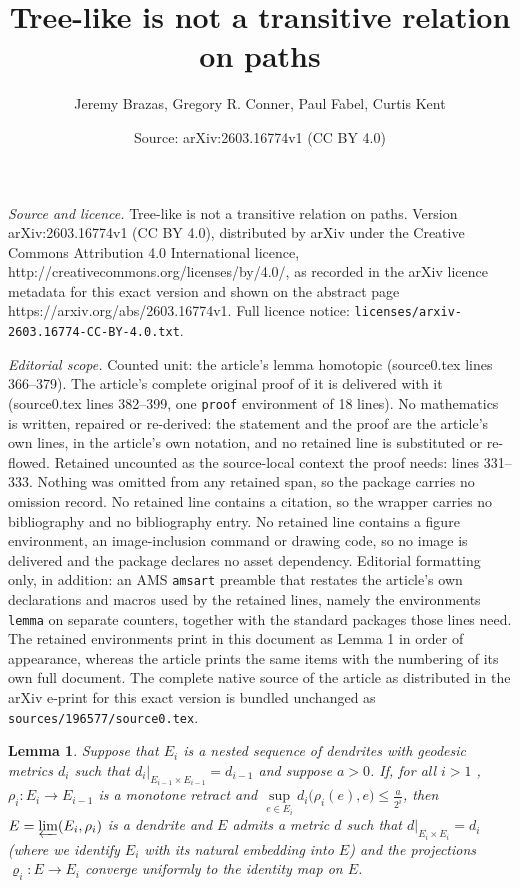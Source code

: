 \documentclass[10pt,a4paper]{amsart}
\title{Tree-like is not a transitive relation on paths}
\author{Jeremy Brazas, Gregory R. Conner, Paul Fabel, Curtis Kent}
\date{Source: arXiv:2603.16774v1 (CC BY 4.0)}
\newtheorem{lemma}{Lemma}
\begin{document}
\maketitle

\noindent\emph{Source and licence.} Tree-like is not a transitive relation on paths. Version arXiv:2603.16774v1 (CC BY 4.0), distributed by arXiv under the Creative Commons Attribution 4.0 International licence, http://creativecommons.org/licenses/by/4.0/, as recorded in the arXiv licence metadata for this exact version and shown on the abstract page https://arxiv.org/abs/2603.16774v1. Full licence notice: \texttt{licenses/arxiv-2603.16774-CC-BY-4.0.txt}.\par\smallskip

\noindent\textit{Editorial scope.} Counted unit: the article's lemma homotopic (source0.tex lines 366--379). The article's complete original proof of it is delivered with it (source0.tex lines 382--399, one \texttt{proof} environment of 18 lines). No mathematics is written, repaired or re-derived: the statement and the proof are the article's own lines, in the article's own notation, and no retained line is substituted or re-flowed.  Retained uncounted as the source-local context the proof needs: lines 331--333.  Nothing was omitted from any retained span, so the package carries no omission record.  No retained line contains a citation, so the wrapper carries no bibliography and no bibliography entry.  No retained line contains a figure environment, an image-inclusion command or drawing code, so no image is delivered and the package declares no asset dependency.  Editorial formatting only, in addition: an AMS \texttt{amsart} preamble that restates the article's own declarations and macros used by the retained lines, namely the environments \texttt{lemma} on separate counters, together with the standard packages those lines need.  The retained environments print in this document as Lemma 1 in order of appearance, whereas the article prints the same items with the numbering of its own full document.  The complete native source of the article as distributed in the arXiv e-print for this exact version is bundled unchanged as \texttt{sources/196577/source0.tex}.
\begin{lemma}\label{lem: the dendrite}
Suppose that $E_i$ is a nested sequence of dendrites with geodesic metrics $d_i$ such that $d_{i}|_{E_{i-1}\times E_{i-1}} = d_{i-1}$ and suppose $a>0$. If, for all $i>1$ , $\rho_i:E_i\to E_{i-1}$ is a monotone retract and $\sup\limits_{e\in E_i}d_i\big(\rho_i(e), e\big)\leq \frac{a}{2^i}$, then $E = \varprojlim(E_i, \rho_i)$ is a dendrite and  $E$ admits a metric $d$ such that  $d|_{E_i\times E_i}= d_i$ (where we identify $E_i$ with its natural embedding into $E$) and the projections $\varrho_i: E\to E_i$ converge uniformly to the identity map on $E$.
\end{lemma}
\end{document}

